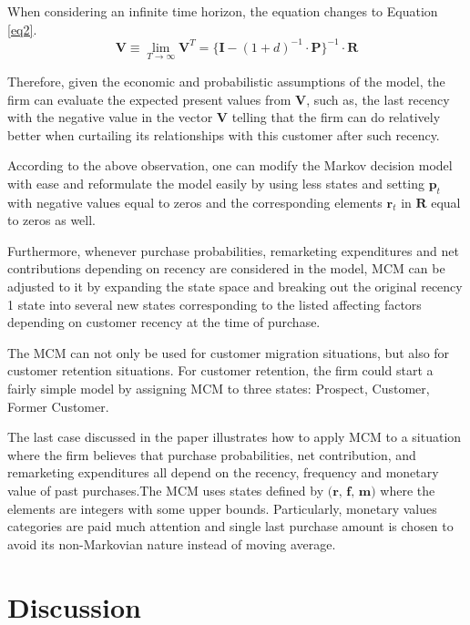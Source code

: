 \documentclass[11pt]{article}
\begin{document}
When considering an infinite time horizon, the equation changes to Equation \ref{eq2}.
\begin{equation}\label{eq2}
\textbf{V} \equiv \lim_{T \rightarrow \infty} \textbf{V}^T = \{\textbf{I} - (1 + d)^{-1} \cdot \textbf{P} \}^{-1} \cdot \textbf{R}
\end{equation}


Therefore, given the economic and probabilistic assumptions of the model, the firm can evaluate the expected present values from $\textbf{V}$, such as, the last recency with the negative value in the vector $\textbf{V}$ telling that the firm can do relatively better when curtailing its relationships with this customer after such recency.

According to the above observation, one can modify the Markov decision model with ease and reformulate the model easily by using less states and setting $\textbf{p}_t$ with negative values equal to zeros and the corresponding elements $\textbf{r}_t$ in $\textbf{R}$ equal to zeros as well.

Furthermore, whenever purchase probabilities, remarketing expenditures and net contributions depending on recency are considered in the model, MCM can be adjusted to it by expanding the state space and breaking out the original recency 1 state into several new states corresponding to the listed affecting factors depending on customer recency at the time of purchase. 

The MCM can not only be used for customer migration situations, but also for customer retention situations. For customer retention, the firm could start a fairly simple model by assigning MCM to three states:  Prospect, Customer, Former Customer. 

The last case discussed in the paper illustrates how to apply MCM to a situation where the firm believes that purchase probabilities, net contribution, and remarketing expenditures all depend on the recency, frequency and monetary value of past purchases.The MCM uses states defined by $\textbf{(r, f, m)}$ where the elements are integers with some upper bounds. Particularly, monetary values categories are paid much attention and single last purchase amount is chosen to avoid its non-Markovian nature instead of moving average.




\section{Discussion}
\end{document}
